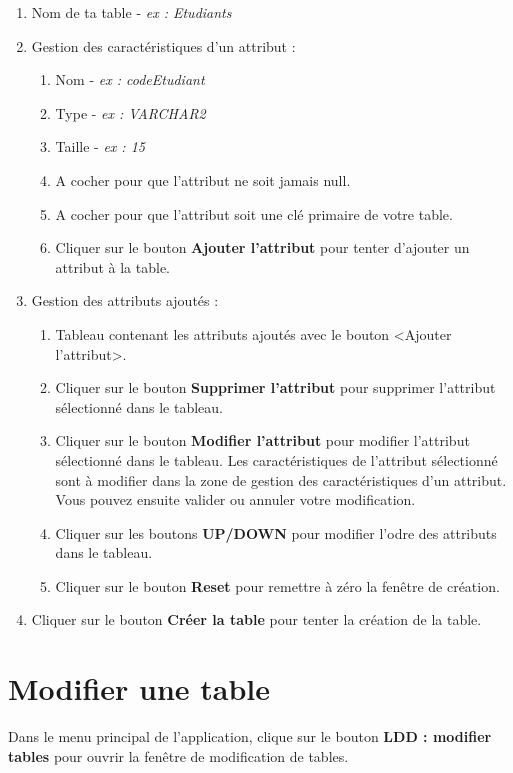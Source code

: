 \begin{enumerate}
\item Nom de ta table - \textit{ex : Etudiants}

\item Gestion des caractéristiques d'un attribut :
\begin{enumerate}
\item Nom - \textit{ex : codeEtudiant}
\item Type - \textit{ex : VARCHAR2}
\item Taille - \textit{ex : 15}
\item A cocher pour que l'attribut ne soit jamais null.
\item A cocher pour que l'attribut soit une clé primaire de votre table.
\item Cliquer sur le bouton \textbf{Ajouter l'attribut} pour tenter d'ajouter un attribut à la table.
\end{enumerate}

\item Gestion des attributs ajoutés :
\begin{enumerate}
\item Tableau contenant les attributs ajoutés avec le bouton <Ajouter l'attribut>.
\item Cliquer sur le bouton \textbf{Supprimer l'attribut} pour supprimer l'attribut sélectionné dans le tableau.
\item Cliquer sur le bouton \textbf{Modifier l'attribut} pour modifier l'attribut sélectionné dans le tableau. 
Les caractéristiques de l'attribut sélectionné sont à modifier dans la zone de gestion des caractéristiques d'un attribut. 
Vous pouvez ensuite valider ou annuler votre modification.
\item Cliquer sur les boutons \textbf{UP/DOWN} pour modifier l'odre des attributs dans le tableau. 
\item Cliquer sur le bouton \textbf{Reset} pour remettre à zéro la fen\^etre de création.
\end{enumerate}

\item Cliquer sur le bouton \textbf{Créer la table} pour tenter la création de la table.
\end{enumerate}





\section{Modifier une table}
Dans le menu principal de l'application, clique sur le bouton \textbf{LDD : modifier tables} pour ouvrir la fenêtre de modification de tables.


